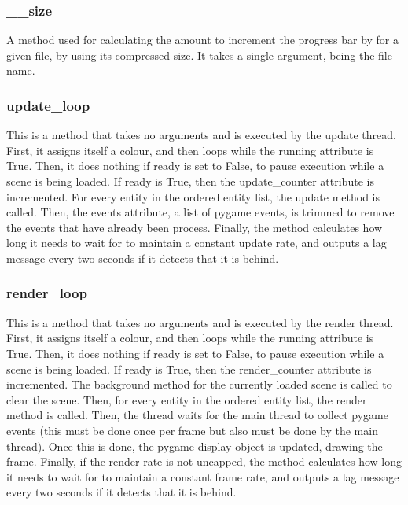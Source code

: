 \documentclass{report}
\begin{document}
\subsubsection{\_\_size}

A method used for calculating the amount to increment the progress bar by for a given file, by using its compressed size. It takes a single argument, being the file name.

\subsubsection{update\_loop}

This is a method that takes no arguments and is executed by the update thread. First, it assigns itself a colour, and then loops while the running attribute is True. Then, it does nothing if ready is set to False, to pause execution while a scene is being loaded. If ready is True, then the update\_counter attribute is incremented. For every entity in the ordered entity list, the update method is called. Then, the events attribute, a list of pygame events, is trimmed to remove the events that have already been process. Finally, the method calculates how long it needs to wait for to maintain a constant update rate, and outputs a lag message every two seconds if it detects that it is behind.

\subsubsection{render\_loop}

This is a method that takes no arguments and is executed by the render thread. First, it assigns itself a colour, and then loops while the running attribute is True. Then, it does nothing if ready is set to False, to pause execution while a scene is being loaded. If ready is True, then the render\_counter attribute is incremented. The background method for the currently loaded scene is called to clear the scene. Then, for every entity in the ordered entity list, the render method is called. Then, the thread waits for the main thread to collect pygame events (this must be done once per frame but also must be done by the main thread). Once this is done, the pygame display object is updated, drawing the frame. Finally, if the render rate is not uncapped, the method calculates how long it needs to wait for to maintain a constant frame rate, and outputs a lag message every two seconds if it detects that it is behind.
\end{document}
